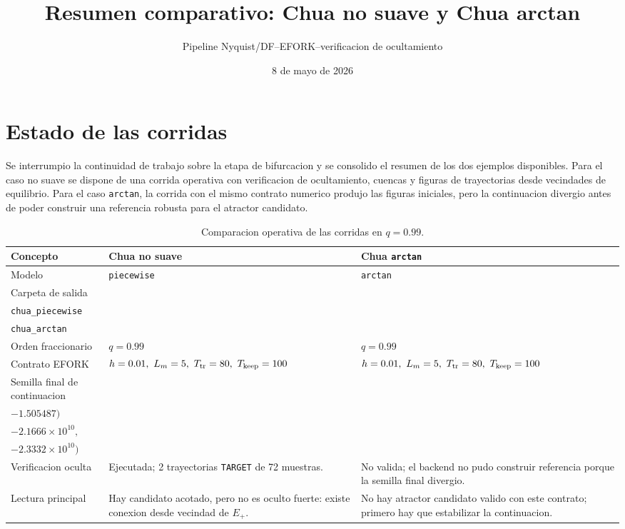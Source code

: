 \documentclass[11pt]{article}
\title{Resumen comparativo: Chua no suave y Chua arctan}
\author{Pipeline Nyquist/DF--EFORK--verificacion de ocultamiento}
\date{8 de mayo de 2026}
\begin{document}
\maketitle

\section*{Estado de las corridas}

Se interrumpio la continuidad de trabajo sobre la etapa de bifurcacion y se
consolido el resumen de los dos ejemplos disponibles. Para el caso no suave se
dispone de una corrida operativa con verificacion de ocultamiento, cuencas y
figuras de trayectorias desde vecindades de equilibrio. Para el caso
\texttt{arctan}, la corrida con el mismo contrato numerico produjo las figuras
iniciales, pero la continuacion divergio antes de poder construir una referencia
robusta para el atractor candidato.

\begin{table}[H]
\centering
\caption{Comparacion operativa de las corridas en \(q=0.99\).}
\begin{tabularx}{\textwidth}{lXX}
\toprule
Concepto & Chua no suave & Chua \texttt{arctan} \\
\midrule
Modelo & \texttt{piecewise} & \texttt{arctan} \\
Carpeta de salida &
\begin{tabular}[t]{@{}l@{}}\texttt{chua\_no\_suave\_q0p99\_run}\\\texttt{chua\_piecewise}\end{tabular} &
\begin{tabular}[t]{@{}l@{}}\texttt{chua\_arctan\_run}\\\texttt{chua\_arctan}\end{tabular} \\
Orden fraccionario & \(q=0.99\) & \(q=0.99\) \\
Contrato EFORK & \(h=0.01,\ L_m=5,\ T_{\rm tr}=80,\ T_{\rm keep}=100\) &
\(h=0.01,\ L_m=5,\ T_{\rm tr}=80,\ T_{\rm keep}=100\) \\
Semilla final de continuacion &
\begin{tabular}[t]{@{}l@{}}\((2.088159,\ 1.540769,\)\\\(-1.505487)\)\end{tabular} &
\begin{tabular}[t]{@{}l@{}}\((-1.3415{\times}10^{10},\)\\\(-2.1666{\times}10^{10},\)\\\(-2.3332{\times}10^{10})\)\end{tabular} \\
Verificacion oculta &
Ejecutada; 2 trayectorias \texttt{TARGET} de 72 muestras. &
No valida; el backend no pudo construir referencia porque la semilla final divergio. \\
Lectura principal &
Hay candidato acotado, pero no es oculto fuerte: existe conexion desde vecindad de \(E_+\). &
No hay atractor candidato valido con este contrato; primero hay que estabilizar la continuacion. \\
\bottomrule
\end{tabularx}
\end{table}
\end{document}
